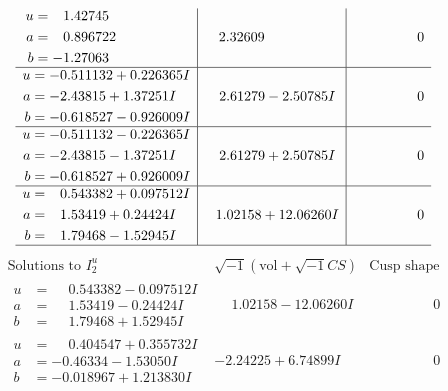 \documentclass[1p]{elsarticle_modified}
\theoremstyle{definition}
\newcommand{\I}{\sqrt{-1}}
\begin{document}
$$\begin{array}{c|c|c}
\begin{aligned}
u &= \phantom{-}1.42745\phantom{ +0.000000I} \\
a &= \phantom{-}0.896722\phantom{ +0.000000I} \\
b &= -1.27063\phantom{ +0.000000I}\end{aligned}
 & \phantom{-}2.32609\phantom{ +0.000000I} & \phantom{-0.000000 } 0 \\ \hline\begin{aligned}
u &= -0.511132 + 0.226365 I \\
a &= -2.43815 + 1.37251 I \\
b &= -0.618527 - 0.926009 I\end{aligned}
 & \phantom{-}2.61279 - 2.50785 I & \phantom{-0.000000 } 0 \\ \hline\begin{aligned}
u &= -0.511132 - 0.226365 I \\
a &= -2.43815 - 1.37251 I \\
b &= -0.618527 + 0.926009 I\end{aligned}
 & \phantom{-}2.61279 + 2.50785 I & \phantom{-0.000000 } 0 \\ \hline\begin{aligned}
u &= \phantom{-}0.543382 + 0.097512 I \\
a &= \phantom{-}1.53419 + 0.24424 I \\
b &= \phantom{-}1.79468 - 1.52945 I\end{aligned}
 & \phantom{-}1.02158 + 12.06260 I & \phantom{-0.000000 } 0\\
 \hline 
 \end{array}$$\newpage$$\begin{array}{c|c|c}  
\text{Solutions to }I^u_{2}& \I (\text{vol} + \sqrt{-1}CS) & \text{Cusp shape}\\
 \hline 
\begin{aligned}
u &= \phantom{-}0.543382 - 0.097512 I \\
a &= \phantom{-}1.53419 - 0.24424 I \\
b &= \phantom{-}1.79468 + 1.52945 I\end{aligned}
 & \phantom{-}1.02158 - 12.06260 I & \phantom{-0.000000 } 0 \\ \hline\begin{aligned}
u &= \phantom{-}0.404547 + 0.355732 I \\
a &= -0.46334 - 1.53050 I \\
b &= -0.018967 + 1.213830 I\end{aligned}
 & -2.24225 + 6.74899 I & \phantom{-0.000000 } 0 \\ \hline\begin{aligned}

\end{aligned}
\end{array}$$
\end{document}
